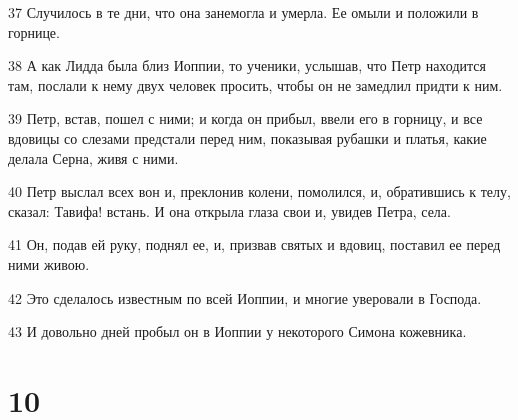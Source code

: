 \par 37 Случилось в те дни, что она занемогла и умерла. Ее омыли и положили в горнице.
\par 38 А как Лидда была близ Иоппии, то ученики, услышав, что Петр находится там, послали к нему двух человек просить, чтобы он не замедлил придти к ним.
\par 39 Петр, встав, пошел с ними; и когда он прибыл, ввели его в горницу, и все вдовицы со слезами предстали перед ним, показывая рубашки и платья, какие делала Серна, живя с ними.
\par 40 Петр выслал всех вон и, преклонив колени, помолился, и, обратившись к телу, сказал: Тавифа! встань. И она открыла глаза свои и, увидев Петра, села.
\par 41 Он, подав ей руку, поднял ее, и, призвав святых и вдовиц, поставил ее перед ними живою.
\par 42 Это сделалось известным по всей Иоппии, и многие уверовали в Господа.
\par 43 И довольно дней пробыл он в Иоппии у некоторого Симона кожевника.

\chapter{10}

